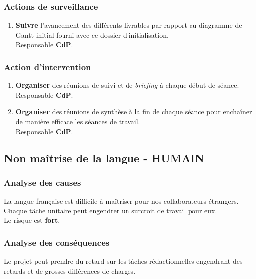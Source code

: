 \subsubsection{Actions de surveillance}

\begin{enumerate}
\item {\bf Suivre} l'avancement des différents livrables par rapport au diagramme
de Gantt initial fourni avec ce dossier d'initialisation. \\
Responsable {\bf CdP}.
\end{enumerate}

\subsubsection{Action d'intervention}

\begin{enumerate}
\item {\bf Organiser} des réunions de suivi et de \textsl{briefing} à chaque
début de séance. \\
Responsable {\bf CdP}.
\item {\bf Organiser} des réunions de synthèse à la fin de chaque séance pour
enchaîner de manière efficace les séances de travail. \\
Responsable {\bf CdP}.
\end{enumerate}

\subsection{Non maîtrise de la langue - HUMAIN}
\subsubsection{Analyse des causes}

La langue française est difficile à maîtriser pour nos collaborateurs étrangers.
Chaque tâche unitaire peut engendrer un surcroit de travail pour eux. \\
Le risque est {\bf fort}.

\subsubsection{Analyse des conséquences}

Le projet peut prendre du retard sur les tâches rédactionnelles engendrant des
retards et de grosses différences de charges.

